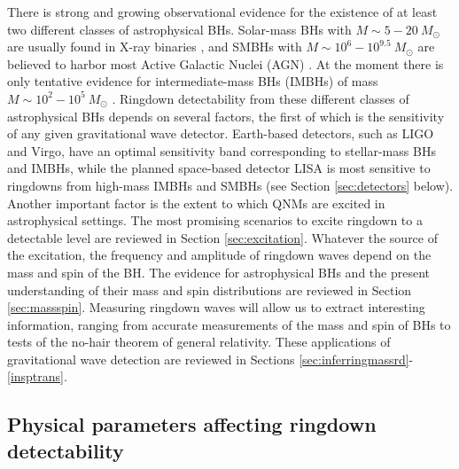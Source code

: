 \documentclass[]{iopart}
\begin{document}
There is strong and growing observational evidence for the existence of at
least two different classes of astrophysical BHs. Solar-mass BHs with $M\sim
5-20~M_\odot$ are usually found in X-ray binaries \cite{Remillard:2006fc}, and
SMBHs with $M\sim 10^6-10^{9.5}~M_\odot$ are believed to harbor most Active
Galactic Nuclei (AGN) \cite{Melia:2007vt}.  At the moment there is only
tentative evidence for intermediate-mass BHs (IMBHs) of mass $M\sim
10^2-10^5~M_\odot$ \cite{Miller:2003sc,Hurley:2007as,Berghea:2008rc}. Ringdown
detectability from these different classes of astrophysical BHs depends on
several factors, the first of which is the sensitivity of any given
gravitational wave detector.  Earth-based detectors, such as LIGO and Virgo,
have an optimal sensitivity band corresponding to stellar-mass BHs and IMBHs,
while the planned space-based detector LISA is most sensitive to ringdowns
from high-mass IMBHs and SMBHs (see Section \ref{sec:detectors} below).
Another important factor is the extent to which QNMs are excited in
astrophysical settings. The most promising scenarios to excite ringdown to a
detectable level are reviewed in Section \ref{sec:excitation}. Whatever the
source of the excitation, the frequency and amplitude of ringdown waves depend
on the mass and spin of the BH.  The evidence for astrophysical BHs and the
present understanding of their mass and spin distributions are reviewed in
Section \ref{sec:massspin}.  Measuring ringdown waves will allow us to extract
interesting information, ranging from accurate measurements of the mass and
spin of BHs to tests of the no-hair theorem of general relativity. These
applications of gravitational wave detection are reviewed in Sections
\ref{sec:inferringmassrd}-\ref{insptrans}.

\subsection{\label{sec:detectors}Physical parameters affecting ringdown detectability} 
\end{document}
